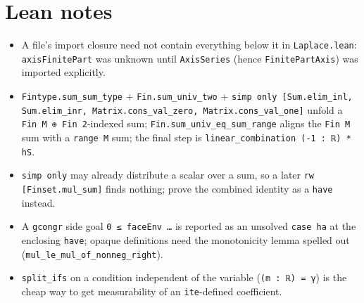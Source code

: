 \documentclass[11pt]{article}
\begin{document}
\section{Lean notes}

\begin{itemize}
\item A file's import closure need not contain everything below it in \texttt{Laplace.lean}:
\texttt{axisFinitePart} was unknown until \texttt{AxisSeries} (hence \texttt{FinitePartAxis}) was
imported explicitly.
\item \texttt{Fintype.sum\_sum\_type} + \texttt{Fin.sum\_univ\_two} + \texttt{simp only
[Sum.elim\_inl, Sum.elim\_inr, Matrix.cons\_val\_zero, Matrix.cons\_val\_one]} unfold a
\texttt{Fin M ⊕ Fin 2}-indexed sum; \texttt{Fin.sum\_univ\_eq\_sum\_range} aligns the
\texttt{Fin M} sum with a \texttt{range M} sum; the final step is
\texttt{linear\_combination (-1 : ℝ) * hS}.
\item \texttt{simp only} may already distribute a scalar over a sum, so a later
\texttt{rw [Finset.mul\_sum]} finds nothing; prove the combined identity as a \texttt{have} instead.
\item A \texttt{gcongr} side goal \texttt{0 ≤ faceEnv …} is reported as an unsolved
\texttt{case ha} at the enclosing \texttt{have}; opaque definitions need the monotonicity lemma
spelled out (\texttt{mul\_le\_mul\_of\_nonneg\_right}).
\item \texttt{split\_ifs} on a condition independent of the variable (\texttt{(m : ℝ) = γ}) is the
cheap way to get measurability of an \texttt{ite}-defined coefficient.
\end{itemize}
\end{document}
